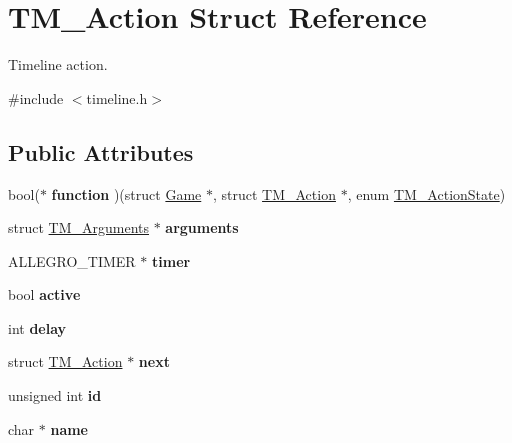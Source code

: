 \hypertarget{structTM__Action}{\section{\-T\-M\-\_\-\-Action \-Struct \-Reference}
\label{structTM__Action}
}


\-Timeline action.  




{\ttfamily \#include $<$timeline.\-h$>$}

\subsection*{\-Public \-Attributes}
\begin{DoxyCompactItemize}
\item 
\hypertarget{structTM__Action_a7935399aa8077d154e7d1ce64f5a13c5}{bool($\ast$ {\bfseries function} )(struct \hyperlink{structGame}{\-Game} $\ast$, struct \hyperlink{structTM__Action}{\-T\-M\-\_\-\-Action} $\ast$, enum \hyperlink{timeline_8h_a76cf4bbb9006628ae8bcd1a4f3afdf87}{\-T\-M\-\_\-\-Action\-State})}\label{structTM__Action_a7935399aa8077d154e7d1ce64f5a13c5}

\item 
\hypertarget{structTM__Action_a061dfb7f5496731aaf448a04491263ac}{struct \hyperlink{structTM__Arguments}{\-T\-M\-\_\-\-Arguments} $\ast$ {\bfseries arguments}}\label{structTM__Action_a061dfb7f5496731aaf448a04491263ac}

\item 
\hypertarget{structTM__Action_adf47bc086ee38527104d0113fab58386}{\-A\-L\-L\-E\-G\-R\-O\-\_\-\-T\-I\-M\-E\-R $\ast$ {\bfseries timer}}\label{structTM__Action_adf47bc086ee38527104d0113fab58386}

\item 
\hypertarget{structTM__Action_a6ff56cc7060fa2369a3879b4244180e7}{bool {\bfseries active}}\label{structTM__Action_a6ff56cc7060fa2369a3879b4244180e7}

\item 
\hypertarget{structTM__Action_a73181b4f19f197b992ed98d11d3964a8}{int {\bfseries delay}}\label{structTM__Action_a73181b4f19f197b992ed98d11d3964a8}

\item 
\hypertarget{structTM__Action_a86d8200abe82ba1359340b6dc2e5ac5f}{struct \hyperlink{structTM__Action}{\-T\-M\-\_\-\-Action} $\ast$ {\bfseries next}}\label{structTM__Action_a86d8200abe82ba1359340b6dc2e5ac5f}

\item 
\hypertarget{structTM__Action_ac0e11136dc5327f709d82e8d417bb088}{unsigned int {\bfseries id}}\label{structTM__Action_ac0e11136dc5327f709d82e8d417bb088}

\item 
\hypertarget{structTM__Action_a2c6ba822db618531770d3c834fb4ec8a}{char $\ast$ {\bfseries name}}\label{structTM__Action_a2c6ba822db618531770d3c834fb4ec8a}

\end{DoxyCompactItemize}


